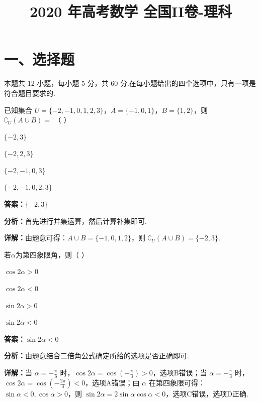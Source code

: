 ﻿\title{2020 年高考数学 全国II卷-理科}
\date{}
\maketitle

\section*{一、选择题}
本题共 12 小题，每小题 5 分，共 60 分.在每小题给出的四个选项中，只有一项是符合题目要求的.

\begin{question}[points=5]
已知集合 $U=\{-2,-1,0,1,2,3\}$，$A=\{-1,0,1\}$，$B=\{1,2\}$，则 $\complement_U(A\cup B)=$ （ ）
\begin{choices}
  \item $\{-2,3\}$
  \item $\{-2,2,3\}$
  \item $\{-2,-1,0,3\}$
  \item $\{-2,-1,0,2,3\}$
\end{choices}
\begin{solution}
\textbf{答案：}$\{-2,3\}$

\textbf{分析：}首先进行并集运算，然后计算补集即可.

\textbf{详解：}由题意可得：$A\cup B=\{-1,0,1,2\}$，则 $\complement_U(A\cup B)=\{-2,3\}$.
\end{solution}
\end{question}

\begin{question}[points=5]
若$\alpha$为第四象限角，则（ ）
\begin{choices}
  \item $\cos2\alpha>0$
  \item $\cos2\alpha<0$
  \item $\sin2\alpha>0$
  \item $\sin2\alpha<0$
\end{choices}
\begin{solution}
\textbf{答案：}$\sin2\alpha<0$

\textbf{分析：}由题意结合二倍角公式确定所给的选项是否正确即可.

\textbf{详解：}当 $\alpha=-\frac{\pi}{6}$ 时，$\cos2\alpha=\cos\left(-\frac{\pi}{3}\right)>0$，选项B错误；当 $\alpha=-\frac{\pi}{3}$ 时，$\cos2\alpha=\cos\left(-\frac{2\pi}{3}\right)<0$，选项A错误；由 $\alpha$ 在第四象限可得：$\sin\alpha<0,\cos\alpha>0$，则 $\sin2\alpha=2\sin\alpha\cos\alpha<0$，选项C错误，选项D正确.
\end{solution}
\end{question}

